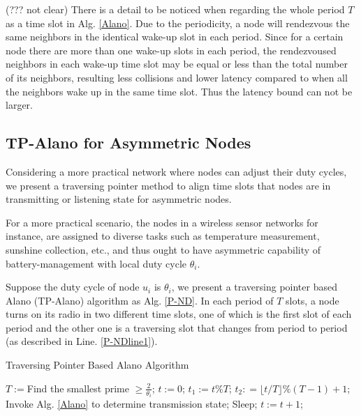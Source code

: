 (??? not clear) There is a detail to be noticed when regarding the whole period $T$ as a time slot in Alg. \ref{Alano}.
Due to the periodicity, a node will rendezvous the same neighbors in the identical wake-up slot in each period.
Since for a certain node there are more than one wake-up slots in each period,
the rendezvoused neighbors in each wake-up time slot may be equal or less than the total number of its neighbors,
resulting less collisions and lower latency compared to when all the neighbors wake up in the same time slot.
Thus the latency bound can not be larger.


\subsection{TP-Alano for Asymmetric Nodes}


Considering a more practical network where nodes can adjust their duty cycles, we present a traversing pointer method to align time slots that nodes are in transmitting or listening state for asymmetric nodes.


For a more practical scenario, the nodes in a wireless sensor networks
for instance, are assigned to diverse tasks such as temperature measurement,
sunshine collection, etc., and thus ought to have asymmetric capability of
battery-management with local duty cycle $\theta_i$.

Suppose the duty cycle of node $u_i$ is $\theta_i$, we present a traversing pointer based Alano (TP-Alano) algorithm as Alg. \ref{P-ND}.
In each period of $T$ slots, a node turns on its radio in two different time slots, one of which is the
first slot of each period and the other one is a traversing slot that changes from period to period (as described in Line. \ref{P-NDline1}).

\begin{algorithm}[!h]
\caption{Traversing Pointer Based Alano Algorithm}
\label{P-ND}
\begin{algorithmic}[1]
\STATE $T := $Find the smallest prime $\geq \frac{2}{\theta_i}$;
\STATE $t := 0$;
	\STATE $t_1 := t \% T$;
	\STATE $t_2 : =\lfloor t / T \rfloor \% (T - 1) +1$;\label{P-NDline1}
    		\STATE Invoke Alg. \ref{Alano} to determine transmission state;
	\ELSE
    		\STATE Sleep;
	\ENDIF
	\STATE $t := t + 1$;
\ENDWHILE
\end{algorithmic}
\end{algorithm}

